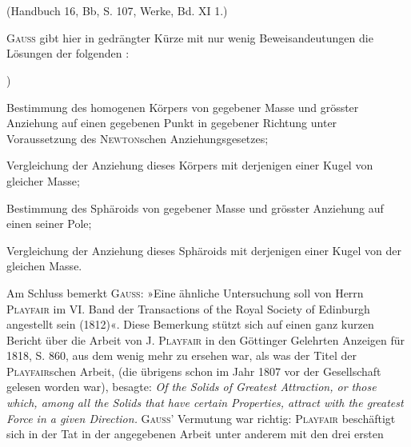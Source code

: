 \clearpage\begingroup\NoSourceHead{}
\renewcommand{\thefootnote}{\arabic{footnote})}\setcounter{footnote}{4}
\begin{center}\\
\\
\small (Handbuch 16, Bb, S. 107, Werke, Bd. XI 1.)\end{center}
\noindent\hspace*{\parindent}\textsc{Gauss} gibt hier in gedrängter Kürze mit nur wenig Beweisandeutungen
die Lösungen der folgenden :
\begin{list}{)}{\setlength{\leftmargin}{2.4em}\setlength{\itemsep}{0pt}\setlength{\topsep}{0pt}}
\item Bestimmung des homogenen Körpers von gegebener Masse und grösster
Anziehung auf einen gegebenen Punkt in gegebener Richtung unter
Voraussetzung des \textsc{Newton}schen Anziehungsgesetzes;
\item Vergleichung der Anziehung dieses Körpers mit derjenigen einer Kugel
von gleicher Masse;
\item Bestimmung des Sphäroids von gegebener Masse und grösster Anziehung auf einen seiner Pole;
\item Vergleichung der Anziehung dieses Sphäroids mit derjenigen einer
Kugel von der gleichen Masse.
\end{list}
\par\noindent\hspace*{\parindent}Am Schluss bemerkt \textsc{Gauss}: »Eine ähnliche Untersuchung soll von Herrn
\textsc{Playfair} im VI. Band der Transactions of the Royal Society of Edinburgh
angestellt sein (1812)«. Diese Bemerkung stützt sich auf einen ganz kurzen
Bericht über die Arbeit von J. \textsc{Playfair} in den Göttinger Gelehrten Anzeigen
\clearpage{}
\noindent für 1818, S. 860, aus dem wenig mehr zu ersehen war, als was der Titel der
\textsc{Playfair}schen Arbeit, (die übrigens schon im Jahr 1807 vor der Gesellschaft
gelesen worden war), besagte: \textit{Of the Solids of Greatest Attraction, or those
which, among all the Solids that have certain Properties, attract with the greatest
Force in a given Direction.} \textsc{Gauss}’ Vermutung war richtig: \textsc{Playfair} beschäftigt
sich in der Tat in der angegebenen Arbeit unter anderem mit den drei ersten
